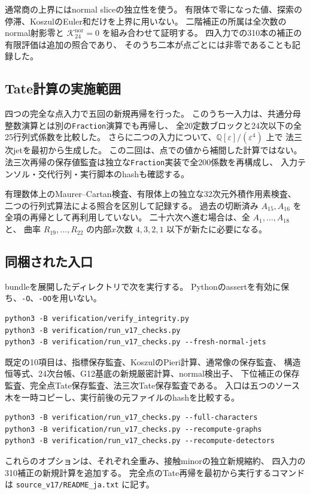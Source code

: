\documentclass[a4paper,11pt]{ltjsarticle}
\theoremstyle{definition}
\begin{document}
通常商の上界にはnormal sliceの独立性を使う。
有限体で零になった値、探索の停滞、KoszulのEuler和だけを上界に用いない。
二階補正の所属は全次数のnormal射影零と
$\mathcal K_{24}^{\mathrm{nor}}=0$ を組み合わせて証明する。
四入力での310本の補正の有限評価は追加の照合であり、
そのうち二本が点ごとには非零であることも記録した。

\subsection{Tate計算の実施範囲}

四つの完全な点入力で五回の新規再帰を行った。
このうち一入力は、共通分母整数演算とは別の\texttt{Fraction}演算でも再帰し、
全20定数ブロックと24次以下の全25行列式係数を比較した。
さらに二つの入力について、$\mathbb Q[\varepsilon]/(\varepsilon^4)$ 上で
法三次jetを最初から生成した。
この二回は、点での値から補間した計算ではない。
法三次再帰の保存値監査は独立な\texttt{Fraction}実装で全200係数を再構成し、
入力テンソル・交代行列・実行脚本のhashも確認する。

有理数体上のMaurer--Cartan検査、有限体上の独立な32次元外積作用素検査、
二つの行列式算法による照合を区別して記録する。
過去の切断済み $A_{15},A_{16}$ を全項の再帰として再利用していない。
二十六次へ進む場合は、全 $A_1,\ldots,A_{18}$ と、
曲率 $R_{19},\ldots,R_{22}$ の内部$x$次数 $4,3,2,1$ 以下が新たに必要になる。

\subsection{同梱された入口}

bundleを展開したディレクトリで次を実行する。
Pythonのassertを有効に保ち、\texttt{-O}、\texttt{-OO}を用いない。
\begin{verbatim}
python3 -B verification/verify_integrity.py
python3 -B verification/run_v17_checks.py
python3 -B verification/run_v17_checks.py --fresh-normal-jets
\end{verbatim}
既定の10項目は、指標保存監査、KoszulのPieri計算、通常像の保存監査、
構造恒等式、24次台帳、G12基底の新規厳密計算、normal検出子、
下位補正の保存監査、完全点Tate保存監査、法三次Tate保存監査である。
入口は五つのソース木を一時コピーし、実行前後の元ファイルのhashを比較する。
\begin{verbatim}
python3 -B verification/run_v17_checks.py --full-characters
python3 -B verification/run_v17_checks.py --recompute-graphs
python3 -B verification/run_v17_checks.py --recompute-detectors
\end{verbatim}
これらのオプションは、それぞれ全重み、接触minorの独立新規縮約、
四入力の310補正の新規計算を追加する。
完全点のTate再帰を最初から実行するコマンドは
\nolinkurl{source_v17/README_ja.txt} に記す。
\end{document}
